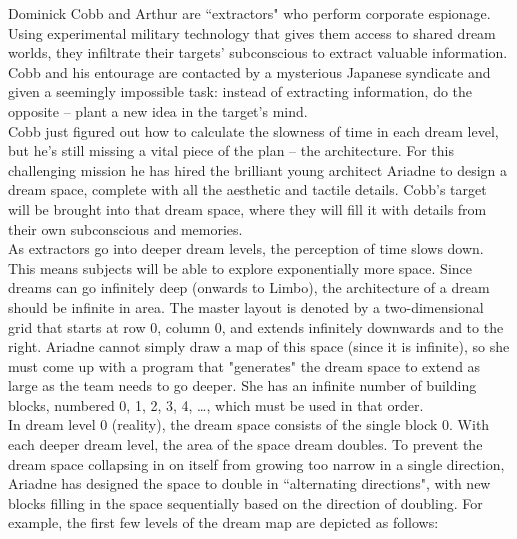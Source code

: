 
\noindent Dominick Cobb and Arthur are ``extractors" who perform corporate espionage. Using experimental military technology that gives them access to shared dream worlds, they infiltrate their targets' subconscious to extract valuable information. Cobb and his entourage are contacted by a mysterious Japanese syndicate and given a seemingly impossible task: instead of extracting information, do the opposite -- plant a new idea in the target's mind.\\

Cobb just figured out how to calculate the slowness of time in each dream level, but he's still missing a vital piece of the plan -- the architecture. For this challenging mission he has hired the brilliant young architect Ariadne to design a dream space, complete with all the aesthetic and tactile details. Cobb's target will be brought into that dream space, where they will fill it with details from their own subconscious and memories.\\

As extractors go into deeper dream levels, the perception of time slows down. This means subjects will be able to explore exponentially more space. Since dreams can go infinitely deep (onwards to Limbo), the architecture of a dream should be infinite in area. The master layout is denoted by a two-dimensional grid that starts at row 0, column 0, and extends infinitely downwards and to the right. Ariadne cannot simply draw a map of this space (since it is infinite), so she must come up with a program that "generates" the dream space to extend as large as the team needs to go deeper. She has an infinite number of building blocks, numbered 0, 1, 2, 3, 4, \dots, which must be used in that order.\\

In dream level 0 (reality), the dream space consists of the single block 0. With each deeper dream level, the area of the space dream doubles. To prevent the dream space collapsing in on itself from growing too narrow in a single direction, Ariadne has designed the space to double in ``alternating directions", with new blocks filling in the space sequentially based on the direction of doubling. For example, the first few levels of the dream map are depicted as follows:\\

